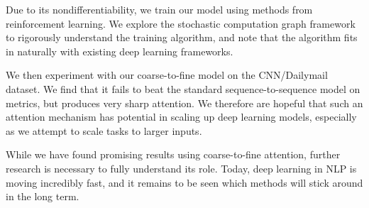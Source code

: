 \documentclass[12pt]{report}
\begin{document}
Due to its nondifferentiability, we train our model using methods from reinforcement learning. We explore the stochastic computation graph framework to rigorously understand the training algorithm, and note that the algorithm fits in naturally with existing deep learning frameworks.

We then experiment with our coarse-to-fine model on the CNN/Dailymail dataset. We find that it fails to beat the standard sequence-to-sequence model on metrics, but produces very sharp attention. We therefore are hopeful that such an attention mechanism has potential in scaling up deep learning models, especially as we attempt to scale tasks to larger inputs.

While we have found promising results using coarse-to-fine attention, further research is necessary to fully understand its role. Today, deep learning in NLP is moving incredibly fast, and it remains to be seen which methods will stick around in the long term.



\end{document}
